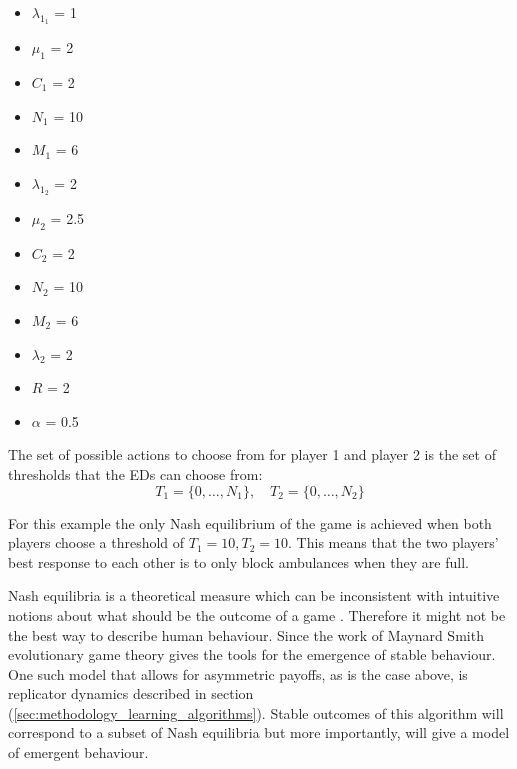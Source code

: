 \begin{multicols}{3}
    \begin{itemize}
        \item \( \lambda_{1_1} \) = 1
        \item \( \mu_1 \) = 2
        \item \( C_1 \) = 2
        \item \( N_1 \) = 10
        \item \( M_1 \) = 6
        \columnbreak

        \item \( \lambda_{1_2} \) = 2
        \item \( \mu_2 \) = 2.5
        \item \( C_2 \) = 2
        \item \( N_2 \) = 10
        \item \( M_2 \) = 6
        \columnbreak

        \item \( \lambda_2 \) = 2
        \item \( R \) = 2
        \item \( \alpha \) = 0.5
    \end{itemize}
\end{multicols}

The set of possible actions to choose from for player 1 and player 2 is the
set of thresholds that the EDs can choose from: 
\begin{equation}
    T_1 = \{ 0, \ldots, N_1 \}, \quad T_2 = \{ 0, \ldots, N_2 \}
\end{equation}

For this example the only Nash equilibrium of the game is achieved when both 
players choose a threshold of \( T_1 = 10, T_2 = 10 \).
This means that the two players' best response to each other is to only block
ambulances when they are full. 

Nash equilibria is a theoretical measure which can be
inconsistent with intuitive notions about what should be the outcome of a 
game \cite{myerson1978refinements}.
Therefore it might not be the best way to describe human behaviour.
Since the work of Maynard Smith \cite{smith1986evolutionary} evolutionary game 
theory gives the tools for the emergence of stable behaviour.
One such model that allows for asymmetric payoffs, as is the case above, is 
replicator dynamics described in section 
(\ref{sec:methodology_learning_algorithms}).
Stable outcomes of this algorithm will correspond to a subset of Nash
equilibria but more importantly, will give a model of emergent behaviour. 

